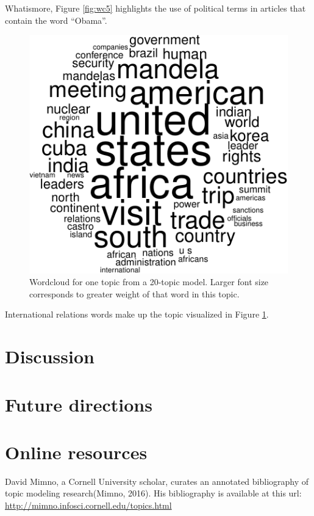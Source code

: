\documentclass[12pt,]{article}
\begin{document}
Whatismore, Figure \ref{fig:wc5} highlights the use of political terms
in articles that contain the word ``Obama''.

\begin{figure}
\includegraphics[width=\textwidth]{2016-03-17-obama_files/figure-latex/wordcloud-8.pdf}
\caption{Wordcloud for one topic from a 20-topic model. Larger font size corresponds to greater weight of that word in this topic.\label{fig:wc8}}
\end{figure}

International relations words make up the topic visualized in Figure
\ref{fig:wc8}.

\section{Discussion}\label{discussion}

\section{Future directions}\label{future-directions}

\section{Online resources}\label{online-resources}

David Mimno, a Cornell University scholar, curates an annotated
bibliography of topic modeling research(Mimno, 2016). His bibliography
is available at this url:
\url{http://mimno.infosci.cornell.edu/topics.html}
\end{document}
